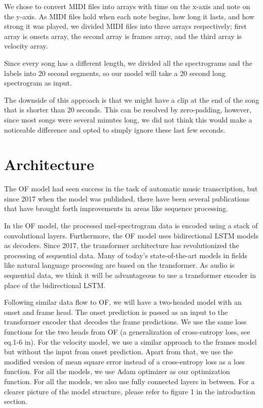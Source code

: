 \documentclass[a4paper,twocolumn,10pt]{article}
\begin{document}
We chose to convert MIDI files into arrays with time on the x-axis and note on the y-axis. As MIDI files hold when each note begins, how long it lasts, and how strong it was played, we divided MIDI files into three arrays respectively; first array is onsets array, the second array is frames array, and the third array is velocity array.

Since every song has a different length, we divided all the spectrograms and the labels into 20 second segments, so our model will take a 20 second long spectrogram as input.

The downside of this approach is that we might have a clip at the end of the song that is shorter than 20 seconds. This can be resolved by zero-padding, however, since most songs were several minutes long, we did not think this would make a noticeable difference and opted to simply ignore these last few seconds.
\section{Architecture}
The OF model\cite{onsets_and_frames} had seen success in the task of automatic music transcription, but since 2017 when the model was published, there have been several publications that have brought forth improvements in areas like sequence processing.

In the OF model, the processed mel-spectrogram data is encoded using a stack of convolutional layers\cite{rainer}. Furthermore, the OF model uses bidirectional LSTM models as decoders. Since 2017, the transformer architecture has revolutionized the processing of sequential data\cite{attention}. Many of today’s state-of-the-art models in fields like natural language processing are based on the transformer. As audio is sequential data, we think it will be advantageous to use a transformer encoder in place of the bidirectional LSTM.

Following similar data flow to OF, we will have a two-headed model with an onset and frame head. The onset prediction is passed as an input to the transformer encoder that decodes the frame predictions. We use the same loss functions for the two heads from OF (a generalization of cross-entropy loss, see eq.1-6 in\cite{onsets_and_frames}). For the velocity model, we use a similar approach to the frames model but without the input from onset prediction. Apart from that, we use the modified version of mean square error instead of a cross-entropy loss as a loss function. For all the models, we use Adam optimizer as our optimization function.  For all the models, we also use fully connected layers in between. For a clearer picture of the model structure, please refer to figure 1 in the introduction section.
\end{document}
